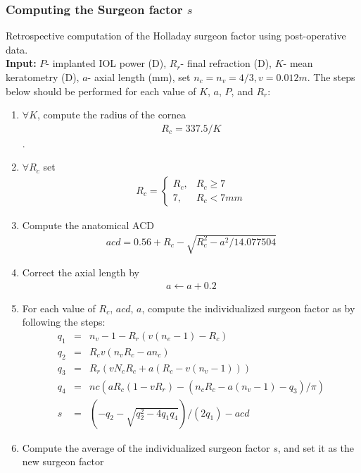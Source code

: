 \documentclass[article,twocolumn,preprint,10pt]{paper}%
\renewcommand{\(}{\left(}
\renewcommand{\)}{\right)}
\renewcommand{\[}{\left[}
\renewcommand{\]}{\right]}
\newcommand{\beq}{\begin{eqnarray}}
\newcommand{\eeq}{\end{eqnarray}}
\newcommand{\1}{\mbox{\boldmath$1$}}
\begin{document}
\subsubsection{Computing the Surgeon factor $s$}\label{subsubsection:theSurgeonFactor}
Retrospective computation of the Holladay surgeon factor using post-operative data.\\
\textbf{Input:} $P$- implanted IOL power (D), $R_r$- final refraction (D), $K$- mean keratometry (D), $a$- axial length (mm), set $n_c=n_v=4/3, v=0.012m$. The steps below should be performed for each value of $K$, $a$, $P$, and $R_r$:
\begin{enumerate}
	\item $\forall K$, compute the radius of the cornea \beq R_c = 337.5/K \nonumber \eeq.
	\item $\forall R_c$ set \beq R_c = \begin{cases}R_c, & R_c\geq 7\\
	7,& R_c<7mm\end{cases}\eeq 
	\item Compute the anatomical ACD \beq acd = 0.56+R_c-\sqrt{R_c^2 -a^2/14.077504}\eeq
	\item Correct the axial length by \beq a\leftarrow a+0.2 \eeq
	\item 
	For each value of $R_c$, $acd$, $a$, compute the individualized surgeon factor as by following the steps:
	\beq 
	  q_1 &=& n_v-1 - R_r(v(n_e-1)-R_c)\nonumber \\
	  q_2 &=& R_cv(n_vR_c-an_c) \nonumber \\
	  q_3 &=& R_r(vN_cR_c+a(R_c-v(n_v-1))) \nonumber \\
	  q_4 &=& nc(aR_c(1-vR_r)-(n_cR_c-a(n_v-1)-q_3)/\pi )\nonumber \\
	  s  &=& (-q_2-\sqrt{q_2^2-4q_1q_4})/(2q_1)-acd  
	\eeq 
	\item Compute the average of the individualized surgeon factor $s$, and set it as the new surgeon factor 
\end{enumerate}





\end{document}
